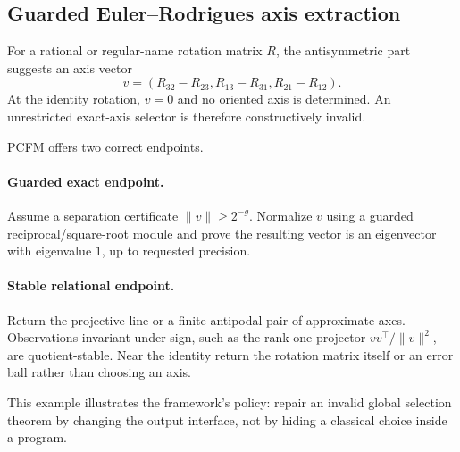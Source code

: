 \subsection{Guarded Euler--Rodrigues axis extraction}

For a rational or regular-name rotation matrix \(R\), the antisymmetric part
suggests an axis vector
\[
   v=(R_{32}-R_{23},R_{13}-R_{31},R_{21}-R_{12}).
\]
At the identity rotation, \(v=0\) and no oriented axis is determined.  An
unrestricted exact-axis selector is therefore constructively invalid.

PCFM offers two correct endpoints.

\paragraph{Guarded exact endpoint.}
Assume a separation certificate \(\|v\|\ge 2^{-g}\).  Normalize \(v\) using a
guarded reciprocal/square-root module and prove the resulting vector is an
eigenvector with eigenvalue \(1\), up to requested precision.

\paragraph{Stable relational endpoint.}
Return the projective line or a finite antipodal pair of approximate axes.
Observations invariant under sign, such as the rank-one projector
\(vv^\top/\|v\|^2\), are quotient-stable.  Near the identity return the
rotation matrix itself or an error ball rather than choosing an axis.

This example illustrates the framework's policy: repair an invalid global
selection theorem by changing the output interface, not by hiding a classical
choice inside a program.
